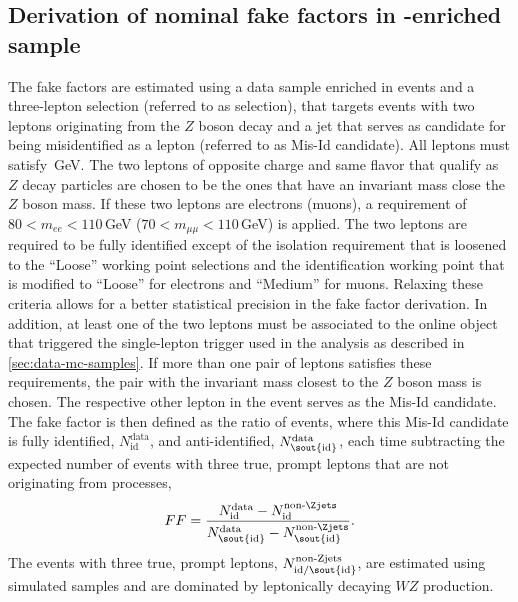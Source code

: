 \subsection{Derivation of nominal fake factors in \Zjets-enriched sample}
\label{subsubsec:zjets-ffs}
The fake factors are estimated using a data sample enriched in \Zjets events and a three-lepton selection (referred to as \Zjets selection), that targets events with two leptons originating from the $Z$ boson decay and a jet that serves as candidate for being misidentified as a lepton (referred to as Mis-Id candidate).
All leptons must satisfy \,GeV.
The two leptons of opposite charge and same flavor that qualify as $Z$ decay particles are chosen to be the ones that have an invariant mass close the $Z$ boson mass. If these two leptons are electrons (muons), a requirement of $80 < m_{ee} < 110\,$GeV ($70 < m_{\mu\mu} < 110\,$GeV) is applied.
The two leptons are required to be fully identified except of the isolation requirement that is loosened to the ``Loose'' working point selections and the identification working point that is modified to ``Loose'' for electrons and ``Medium'' for muons.
Relaxing these criteria allows for a better statistical precision in the fake factor derivation.
In addition, at least one of the two leptons must be associated to the online object that triggered the single-lepton trigger used in the analysis as described in \cref{sec:data-mc-samples}.
If more than one pair of leptons satisfies these requirements, the pair with the invariant mass closest to the $Z$ boson mass is chosen.
The respective other lepton in the event serves as the Mis-Id candidate.
The fake factor is then defined as the ratio of events, where this Mis-Id candidate is fully identified, $N_{\text{id}}^{\text{data}}$, and anti-identified, $N_{\text{\sout{id}}}^{\text{data}}$, each time subtracting the expected number of events with three true, prompt leptons that are not originating from \Zjets processes,
\begin{equation}
    \label{eq:ff}
    FF = \frac{ N_{\text{id}}^{\text{data}} - N_{\text{id}}^{\text{non-\Zjets}}}{N_{\text{\sout{id}}}^{\text{data}} - N_{\text{\sout{id}}}^{\text{non-\Zjets}}}.
\end{equation}
The events with three true, prompt leptons, $N_{\text{id/\sout{id}}}^{\text{non-Zjets}}$, are estimated using simulated samples and are dominated by leptonically decaying $WZ$ production.
